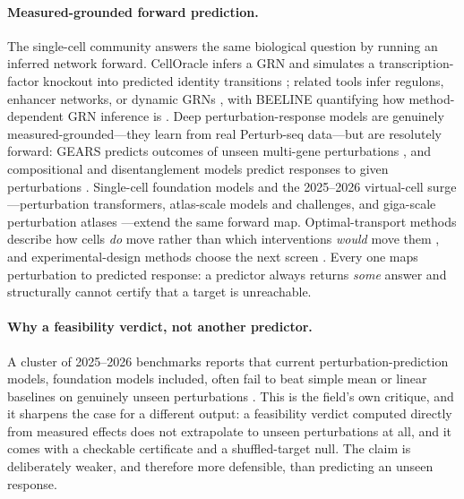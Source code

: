 \paragraph{Measured-grounded forward prediction.}
The single-cell community answers the same biological question by running an inferred
network forward. CellOracle infers a GRN and simulates a transcription-factor knockout
into predicted identity transitions \citep{Kamimoto2023}; related tools infer regulons,
enhancer networks, or dynamic GRNs \citep{Aibar2017,Xu2021,BravoGonzalezBlas2023,%
Wang2023Dictys,Osorio2022}, with BEELINE quantifying how method-dependent GRN inference
is \citep{Pratapa2020}. Deep perturbation-response models are genuinely
measured-grounded---they learn from real Perturb-seq data---but are resolutely forward:
GEARS predicts outcomes of unseen multi-gene perturbations \citep{Roohani2023}, and
compositional and disentanglement models predict responses to given perturbations
\citep{Lotfollahi2019,Lotfollahi2023,Hetzel2022,Piran2024}. Single-cell foundation models
\citep{Theodoris2023,Cui2024,Hao2024} and the 2025--2026 virtual-cell surge---perturbation
transformers, atlas-scale models and challenges, and giga-scale perturbation atlases
\citep{Adduri2025,Roohani2025,Zhang2025Tahoe,Klein2025b}---extend the same forward map.
Optimal-transport methods describe how cells \emph{do} move rather than which interventions
\emph{would} move them \citep{Schiebinger2019,Lange2022}, and experimental-design methods
choose the next screen \citep{Huang2024}. Every one maps perturbation to predicted
response: a predictor always returns \emph{some} answer and structurally cannot certify
that a target is unreachable.

\paragraph{Why a feasibility verdict, not another predictor.}
A cluster of 2025--2026 benchmarks reports that current perturbation-prediction models,
foundation models included, often fail to beat simple mean or linear baselines on
genuinely unseen perturbations \citep{AhlmannEltze2025,Wong2025,Csendes2025,%
Kedzierska2025,Wu2025,Vinas2025,Kernfeld2025,Wei2025,Luecken2025,Atti2025,Mao2026,%
Vollenweider2026}. This is the field's own critique, and it sharpens the case for a
different output: a feasibility verdict computed directly from measured effects does not
extrapolate to unseen perturbations at all, and it comes with a checkable certificate and a
shuffled-target null. The claim is deliberately weaker, and therefore more defensible, than
predicting an unseen response.

